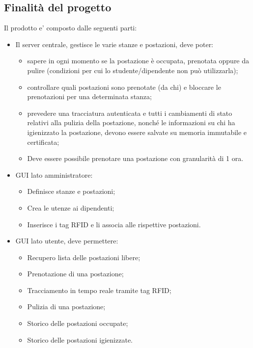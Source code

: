 \subsection{Finalità del progetto}
Il prodotto e' composto dalle seguenti parti:
\begin{itemize}
\item Il server centrale, gestisce le varie stanze e postazioni, deve poter:
\begin{itemize}
\item sapere in ogni momento se la postazione è occupata, prenotata oppure da pulire (condizioni per cui
lo studente/dipendente non può utilizzarla);
\item controllare quali postazioni sono prenotate (da chi) e bloccare le prenotazioni per una determinata stanza;
\item prevedere una tracciatura autenticata e tutti i cambiamenti di stato relativi alla pulizia della
postazione, nonché le informazioni su chi ha igienizzato la postazione, devono essere salvate su
memoria immutabile e certificata;
\item Deve essere possibile prenotare una postazione con granularità di 1 ora.
\end{itemize}
\item GUI lato amministratore:
\begin{itemize}
\item Definisce stanze e postazioni;
\item Crea le utenze ai dipendenti;
\item Inserisce i tag RFID e li associa alle rispettive postazioni.
\end{itemize}
\item GUI lato utente, deve permettere:
\begin{itemize}
\item Recupero lista delle postazioni libere;
\item Prenotazione di una postazione;
\item Tracciamento in tempo reale tramite tag RFID;
\item Pulizia di una postazione;
\item Storico delle postazioni occupate;
\item Storico delle postazioni igienizzate.
\end{itemize}
\end{itemize}

